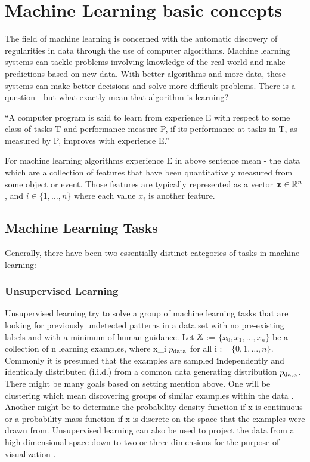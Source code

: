 \documentclass[12pt]{article}
\theoremstyle{definition}
\DeclareRobustCommand{\[}{\begin{equation}}
\DeclareRobustCommand{\]}{\end{equation}}
\begin{document}
\section{Machine Learning basic concepts}
The field of machine learning is concerned with the automatic discovery
of regularities in data through the use of computer algorithms. 
Machine learning systems can tackle problems involving
knowledge of the real world and make predictions based on new data. With better algorithms and more data, these systems can make better decisions and solve more difficult problems.
There is a question - but what exactly mean that algorithm is learning? 

“A computer program is said to learn from experience E
with respect to some class of tasks T and performance measure
P, if its performance at tasks in T, as measured by P, improves with experience E.” \cite{MachineLearning}

For machine learning algorithms experience E in above sentence mean - the data which are a collection of
features that have been quantitatively measured from some object or event. Those features are typically represented as a
vector ${\bm{x}} \in {\mathbb{R}}^{n}$, and $i \in {\{1, \dots, n\}}$ where each value $x_i$ is another feature.

    \subsection{Machine Learning Tasks}
    Generally, there have been two essentially distinct categories of tasks in machine
    learning:
        
        \subsubsection{Unsupervised Learning}
        Unsupervised learning try to solve a group of machine learning tasks that are looking for previously undetected patterns in a data set with no pre-existing labels and with a minimum of human guidance. Let $\displaystyle {\mathbb{X}}$ := $\displaystyle \{x_0, x_1, \dots, x_n \}$ be a collection of n learning examples, where x_i \in\; $\displaystyle p_{\rm{data}}$ for all i \in [n] := \;$\displaystyle \{0, 1, \dots, n \}$. Commonly it is presumed that the examples are sampled \textbf{i}ndependently and \textbf{i}dentically \textbf{d}istributed (i.i.d.) from a common data generating distribution $\displaystyle p_{\rm{data}}$. There might be many goals based on setting mention above. One will be clustering which mean discovering groups of similar examples within the data \cite{clustering}. Another might be to determine the probability density function if x is continuous \cite{density_estimation} or a probability mass function if x is
        discrete \cite{mass_probability_estimation} on the space that the examples were drawn from. Unsupervised learning can also be used to project the data from a high-dimensional
        space down to two or three dimensions for the purpose of visualization \cite{t-sne} \cite{pca}. \cite{ProbabilisticApproach}
        
\end{document}
